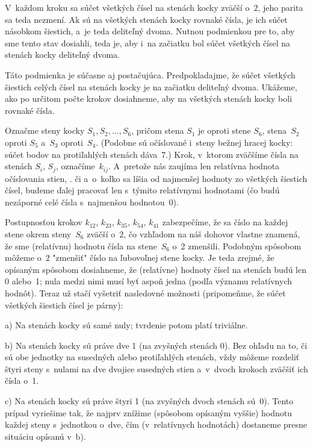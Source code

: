 {%
V~každom kroku sa súčet všetkých čísel na stenách kocky zväčší o~$2$, jeho
parita sa teda nezmení. Ak sú na všetkých stenách kocky rovnaké
čísla, je ich súčet násobkom šiestich, a~je teda deliteľný dvoma. Nutnou
podmienkou pre to, aby sme tento stav dosiahli, teda je, aby i~na začiatku
bol súčet všetkých čísel na stenách kocky deliteľný dvoma.

Táto podmienka je súčasne aj postačujúca. Predpokladajme, že súčet
všetkých šiestich celých čísel na stenách kocky je na začiatku deliteľný dvoma.
Ukážeme, ako po určitom počte krokov dosiahneme, aby na všetkých stenách
kocky boli rovnaké čísla.

Označme steny kocky $S_1,S_2,\dots,S_6$,
pričom stena $S_1$ je oproti stene $S_6$, stena~$S_2$ oproti $S_5$ a~$S_3$
oproti~$S_4$. (Podobne sú očíslované i~steny bežnej hracej kocky:
súčet bodov na protiľahlých stenách dáva~7.)
Krok, v~ktorom zväčšíme čísla na stenách $S_i$, $S_j$, označíme~$k_{ij}$.
A~pretože nás zaujíma len relatívna hodnota očíslovania stien, \tj. či a~o~koľko
sa líšia od najmenšej hodnoty zo všetkých šiestich čísel, budeme ďalej pracovať len s~týmito
relatívnymi hodnotami (čo budú nezáporné celé čísla s~najmenšou hodnotou~0).

Postupnosťou krokov $k_{12}$, $k_{23}$, $k_{35}$, $k_{54}$,
$k_{41}$ zabezpečíme, že sa číslo na každej stene okrem steny~$S_6$
zväčší o~$2$, čo vzhľadom na náš dohovor vlastne znamená, že sme (relatívnu)
hodnotu čísla na stene~$S_6$ o~2 zmenšili.
Podobným spôsobom môžeme o~$2$ "zmenšiť" číslo na ľubovoľnej stene kocky.
Je teda zrejmé, že opísaným spôsobom dosiahneme, že (relatívne) hodnoty
čísel na stenách budú len 0 alebo~1; nula medzi nimi musí byť aspoň jedna (podľa
významu relatívnych hodnôt).
Teraz už stačí vyšetriť nasledovné možnosti (pripomeňme, že súčet všetkých
šiestich čísel je párny):
\item{a)} Na stenách kocky sú samé nuly; tvrdenie potom platí triviálne.
\item{b)} Na stenách kocky sú práve dve 1 (na zvyšných stenách 0). Bez ohľadu na to,
či sú obe jednotky na susedných alebo protiľahlých stenách, vždy môžeme
rozdeliť štyri steny s~nulami na dve dvojice susedných stien
a~v~dvoch krokoch zväčšiť ich čísla o~1.
\item{c)} Na stenách kocky sú práve štyri 1 (na zvyšných dvoch stenách sú~0).
Tento prípad vyriešime tak, že najprv znížime (spôsobom opísaným vyššie) hodnotu každej
steny s~jednotkou o~dve, čím (v~relatívnych hodnotách) dostaneme presne
situáciu opísanú v~b).

}

